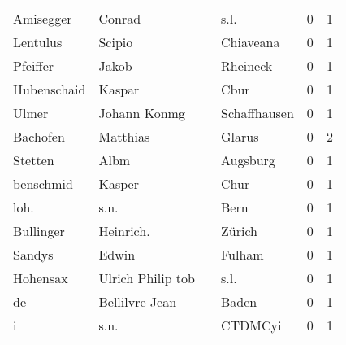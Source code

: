 \begin{center}
\begin{tiny}
\begin{longtabu}{llllrr}
                Amisegger &                             Conrad &             &                                        s.l. &          0 &         1 \\
                 Lentulus &                             Scipio &             &                                   Chiaveana &          0 &         1 \\
                 Pfeiffer &                              Jakob &             &                                    Rheineck &          0 &         1 \\
              Hubenschaid &                             Kaspar &             &                                        Cbur &          0 &         1 \\
                    Ulmer &                       Johann Konmg &             &                                Schaffhausen &          0 &         1 \\
                 Bachofen &                           Matthias &             &                                      Glarus &          0 &         2 \\
                  Stetten &                               Albm &             &                                    Augsburg &          0 &         1 \\
                benschmid &                             Kasper &             &                                        Chur &          0 &         1 \\
                     loh. &                               s.n. &             &                                        Bern &          0 &         1 \\
                Bullinger &                          Heinrich. &             &                                      Zürich &          0 &         1 \\
                   Sandys &                              Edwin &             &                                      Fulham &          0 &         1 \\
                 Hohensax &                  Ulrich Philip tob &             &                                        s.l. &          0 &         1 \\
                       de &                     Bellilvre Jean &             &                                       Baden &          0 &         1 \\
                        i &                               s.n. &             &                                     CTDMCyi &          0 &         1 \\

\end{longtabu}
\end{tiny}
\end{center}
